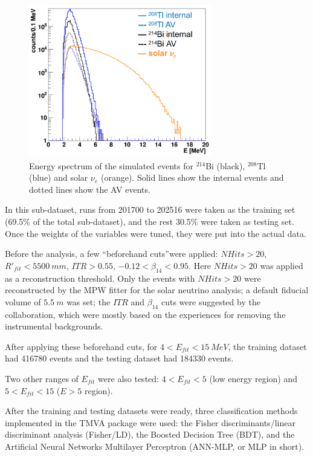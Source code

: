 \begin{figure}[!htb]
	\centering
	\includegraphics[width=8cm]{TMVA_bkgs_1.png}
	\caption{Energy spectrum of the simulated events for $^{214}$Bi (black), $^{208}$Tl (blue) and solar $\nu_e$ (orange). Solid lines show the internal events and dotted lines show the AV events.}
	\label{TMVA_bkgs_1}
\end{figure}

In this sub-dataset, runs from 201700 to 202516 were taken as the training set (69.5\% of the total sub-dataset), and the rest 30.5\% were taken as testing set. Once the weights of the variables were tuned, they were put into the actual data.

Before the analysis, a few ``beforehand cuts''were applied: $NHits>20$, $R'_{fit}<5500~mm$, $ITR>0.55$, $-0.12<\beta_{14}<0.95$. Here $NHits>20$ was applied as a reconstruction threshold. Only the events with $NHits>20$ were reconstructed by the MPW fitter for the solar neutrino analysis; a default fiducial volume of $5.5~m$ was set; the $ITR$ and $\beta_{14}$ cuts were suggested by the collaboration, which were mostly based on the experiences for removing the instrumental backgrounds\cite{waterunidoc}. 

After applying these beforehand cuts, for $4<E_{fit}<15~MeV$, the training dataset had 416780 events and the testing dataset had 184330 events.

Two other ranges of $E_{fit}$ were also tested: $4<E_{fit}<5$ (low energy region) and $5<E_{fit}<15$ ($E>5$ region). %

After the training and testing datasets were ready, three classification methods implemented in the TMVA package were used: the Fisher discriminants/linear discriminant analysis (Fisher/LD), the Boosted Decision Tree (BDT), and the Artificial Neural Networks Multilayer Perceptron (ANN-MLP, or MLP in short)\cite{albertsson2007tmva}.

